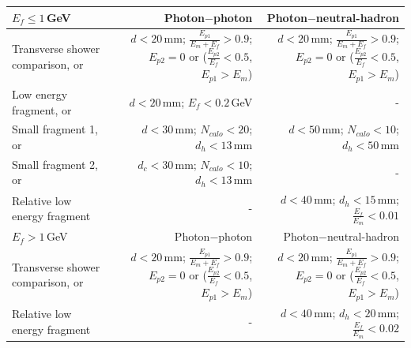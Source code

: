 \begin{table}[htbp]
\centering

\smallskip

\begin{tabular}{l  r  r }
\hline
\hline
$E_f\leqslant1$\,GeV &  Photon$-$photon & Photon$-$neutral-hadron \\
\hline
\multicolumn{1}{L{0.3\textwidth}}{Transverse shower comparison, or} & \multicolumn{1}{R{0.3\textwidth}}{$d < 20 $\,mm; $\frac{E_{p1}}{E_m + E_f} > 0.9 $; $E_{p2} = 0$ or ($\frac{E_{p2}}{E_f} < 0.5 $, $E_{p1} > E_m$)}  & \multicolumn{1}{R{0.3\textwidth}}{$d < 20 $\,mm; $\frac{E_{p1}}{E_m + E_f} > 0.9 $; $E_{p2} = 0$ or ($\frac{E_{p2}}{E_f} < 0.5 $, $E_{p1} > E_m$)} \\
\multicolumn{1}{L{0.3\textwidth}}{Low energy fragment, or} & \multicolumn{1}{R{0.3\textwidth}}{$d < 20 $\,mm; $E_f < 0.2 $\,GeV}  & \multicolumn{1}{R{0.3\textwidth}}{-} \\
\multicolumn{1}{L{0.3\textwidth}}{Small fragment 1, or} & \multicolumn{1}{R{0.3\textwidth}}{$d < 30 $\,mm; $N_{calo} < 20 $; $d_h < 13 $\,mm}  & \multicolumn{1}{R{0.3\textwidth}}{$d < 50 $\,mm; $N_{calo} < 10 $; $d_h < 50$\,mm} \\
\multicolumn{1}{L{0.3\textwidth}}{Small fragment 2, or} & \multicolumn{1}{R{0.3\textwidth}}{$d_c < 30 $\,mm; $N_{calo} < 10 $; $d_h < 13 $\,mm}  & \multicolumn{1}{R{0.3\textwidth}}{-} \\

\multicolumn{1}{L{0.3\textwidth}}{Relative low energy fragment} & \multicolumn{1}{R{0.3\textwidth}}{-}  & \multicolumn{1}{R{0.3\textwidth}}{$d < 40$\,mm; $d_h < 15$\,mm; $\frac{E_{f}}{E_m} < 0.01$} \\
\hline
$E_f>1$\,GeV &  Photon$-$photon & Photon$-$neutral-hadron \\
\hline
\multicolumn{1}{L{0.3\textwidth}}{Transverse shower comparison, or} & \multicolumn{1}{R{0.3\textwidth}}{$d< 20$\,mm; $\frac{E_{p1}}{E_m + E_f} > 0.9 $; $E_{p2} = 0$ or ($\frac{E_{p2}}{E_f} < 0.5 $, $E_{p1} > E_m$)}  & \multicolumn{1}{R{0.3\textwidth}}{$d< 20$\,mm; $\frac{E_{p1}}{E_m + E_f} > 0.9 $; $E_{p2} = 0$ or ($\frac{E_{p2}}{E_f} < 0.5 $, $E_{p1} > E_m$)} \\
\multicolumn{1}{L{0.3\textwidth}}{Relative low energy fragment } & \multicolumn{1}{R{0.3\textwidth}}{-} & \multicolumn{1}{R{0.3\textwidth}}{$d < 40$\,mm; $d_h < 20$\,mm; $\frac{E_f}{E_m} < 0.02$} \\
\hline
\hline
\end{tabular}


\end{table}
